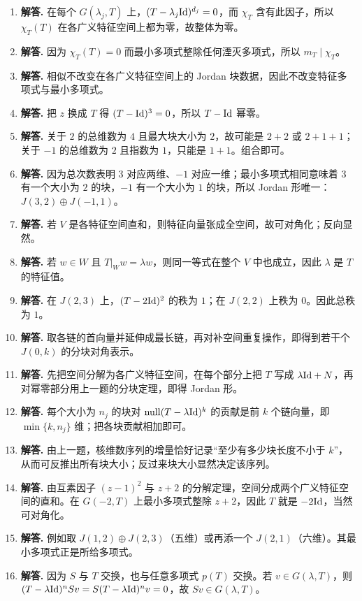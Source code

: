 \begin{enumerate}[label=\textbf{\arabic*.}, leftmargin=*, itemsep=1em]
\item \textbf{解答.} 在每个 $G(\lambda_j,T)$ 上，$(T-\lambda_j\mathrm{Id})^{d_j}=0$，而 $\chi_T$ 含有此因子，所以 $\chi_T(T)$ 在各广义特征空间上都为零，故整体为零。
\item \textbf{解答.} 因为 $\chi_T(T)=0$ 而最小多项式整除任何湮灭多项式，所以 $m_T\mid\chi_T$。
\item \textbf{解答.} 相似不改变在各广义特征空间上的 Jordan 块数据，因此不改变特征多项式与最小多项式。
\item \textbf{解答.} 把 $z$ 换成 $T$ 得 $(T-\mathrm{Id})^3=0$，所以 $T-\mathrm{Id}$ 幂零。
\item \textbf{解答.} 关于 $2$ 的总维数为 $4$ 且最大块大小为 $2$，故可能是 $2+2$ 或 $2+1+1$；关于 $-1$ 的总维数为 $2$ 且指数为 $1$，只能是 $1+1$。组合即可。
\item \textbf{解答.} 因为总次数表明 $3$ 对应两维、$-1$ 对应一维；最小多项式相同意味着 $3$ 有一个大小为 $2$ 的块，$-1$ 有一个大小为 $1$ 的块，所以 Jordan 形唯一：$J(3,2)\oplus J(-1,1)$。
\item \textbf{解答.} 若 $V$ 是各特征空间直和，则特征向量张成全空间，故可对角化；反向显然。
\item \textbf{解答.} 若 $w\in W$ 且 $T|_W w=\lambda w$，则同一等式在整个 $V$ 中也成立，因此 $\lambda$ 是 $T$ 的特征值。
\item \textbf{解答.} 在 $J(2,3)$ 上，$(T-2\mathrm{Id})^2$ 的秩为 $1$；在 $J(2,2)$ 上秩为 $0$。因此总秩为 $1$。
\item \textbf{解答.} 取各链的首向量并延伸成最长链，再对补空间重复操作，即得到若干个 $J(0,k)$ 的分块对角表示。
\item \textbf{解答.} 先把空间分解为各广义特征空间，在每个部分上把 $T$ 写成 $\lambda\mathrm{Id}+N$，再对幂零部分用上一题的分块定理，即得 Jordan 形。
\item \textbf{解答.} 每个大小为 $n_j$ 的块对 $\mathrm{null}(T-\lambda\mathrm{Id})^k$ 的贡献是前 $k$ 个链向量，即 $\min\{k,n_j\}$ 维；把各块贡献相加即可。
\item \textbf{解答.} 由上一题，核维数序列的增量恰好记录“至少有多少块长度不小于 $k$”，从而可反推出所有块大小；反过来块大小显然决定该序列。
\item \textbf{解答.} 由互素因子 $(z-1)^2$ 与 $z+2$ 的分解定理，空间分成两个广义特征空间的直和。在 $G(-2,T)$ 上最小多项式整除 $z+2$，因此 $T$ 就是 $-2\mathrm{Id}$，当然可对角化。
\item \textbf{解答.} 例如取 $J(1,2)\oplus J(2,3)$（五维）或再添一个 $J(2,1)$（六维）。其最小多项式正是所给多项式。
\item \textbf{解答.} 因为 $S$ 与 $T$ 交换，也与任意多项式 $p(T)$ 交换。若 $v\in G(\lambda,T)$，则 $(T-\lambda\mathrm{Id})^nSv=S(T-\lambda\mathrm{Id})^nv=0$，故 $Sv\in G(\lambda,T)$。

\end{enumerate}
